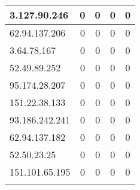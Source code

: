 \documentclass{article}
\begin{document}
\begin{longtable}{|>{\raggedright\arraybackslash}p{3cm}|c|c|c|c|}
    
    \rowcolor{lightgreen} %
    
    3.127.90.246 & 0 & 0 & 0 & 0 \\
    \hline
    
    
    \rowcolor{lightgreen} %
    
    62.94.137.206 & 0 & 0 & 0 & 0 \\
    \hline
    
    
    \rowcolor{lightgreen} %
    
    3.64.78.167 & 0 & 0 & 0 & 0 \\
    \hline
    
    
    \rowcolor{lightgreen} %
    
    52.49.89.252 & 0 & 0 & 0 & 0 \\
    \hline
    
    
    \rowcolor{lightgreen} %
    
    95.174.28.207 & 0 & 0 & 0 & 0 \\
    \hline
    
    
    \rowcolor{lightgreen} %
    
    151.22.38.133 & 0 & 0 & 0 & 0 \\
    \hline
    
    
    \rowcolor{lightgreen} %
    
    93.186.242.241 & 0 & 0 & 0 & 0 \\
    \hline
    
    
    \rowcolor{lightgreen} %
    
    62.94.137.182 & 0 & 0 & 0 & 0 \\
    \hline
    
    
    \rowcolor{lightgreen} %
    
    52.50.23.25 & 0 & 0 & 0 & 0 \\
    \hline
    
    
    \rowcolor{lightgreen} %
    
    151.101.65.195 & 0 & 0 & 0 & 0 \\
    \hline
    
    
    \rowcolor{lightgreen} %
    

\end{longtable}
\end{document}
